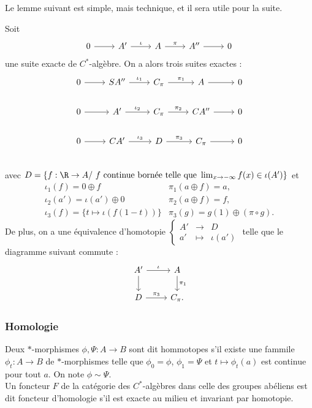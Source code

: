 Le lemme suivant est simple, mais technique, et il sera utile pour la suite.

\begin{lem}
Soit \[\begin{tikzcd}
0\arrow{r} & A' \arrow{r}{\iota} & A \arrow{r}{\pi} & A'' \arrow{r} & 0
\end{tikzcd}\]
une suite exacte de $C^*$-algèbre. On a alors trois suites exactes :
\[\begin{tikzcd}
0\arrow{r} & SA'' \arrow{r}{\iota_1} & C_\pi \arrow{r}{\pi_1} & A \arrow{r} & 0 \\
0\arrow{r} & A' \arrow{r}{\iota_2} & C_\pi \arrow{r}{\pi_2} & CA'' \arrow{r} & 0\\
0\arrow{r} & CA' \arrow{r}{\iota_3} & D \arrow{r}{\pi_3} & C_\pi \arrow{r} & 0\\
\end{tikzcd}\]
avec $D=\{f:\R\rightarrow A /\ f  \text{ continue bornée telle que }\lim_{x\rightarrow -\infty} f (x) \in \iota ( A')\}$ et 
\begin{align*}
\iota_1(f)=0\oplus f & \pi_1(a\oplus f) = a ,\\
\iota_2(a')=\iota(a')\oplus 0 & \pi_2(a\oplus f )=f,\\
\iota_3(f) = \{t\mapsto \iota(f(1-t))\} & \pi_3(g)=g(1)\oplus (\pi\circ g ) .
\end{align*}
De plus, on a une équivalence d'homotopie $\left\{\begin{array}{ccc} A' &\rightarrow& D\\ a' &\mapsto &\iota(a')\end{array}\right.$ telle que le diagramme suivant commute :
\[\begin{tikzcd}A'\arrow{r}{\iota}\arrow{d} & A\arrow{d}{\pi_1}\\ D \arrow{r}{\pi_3} & C_\pi .\end{tikzcd}\]
\end{lem}

\subsubsection{Homologie}

\begin{definition}
Deux $*$-morphismes $\phi,\Psi : A\rightarrow B$ sont dit hommotopes s'il existe une fammile $\phi_t : A\rightarrow B$ de $*$-morphismes telle que $\phi_0=\phi$, $\phi_1=\Psi$ et $t\mapsto \phi_t(a) $ est continue pour tout $a$. On note $\phi\sim\Psi$.\\
Un foncteur $F$ de la catégorie des $C^*$-algèbres dans celle des groupes abéliens est dit foncteur d'homologie s'il est exacte au milieu et invariant par homotopie.
\end{definition}

